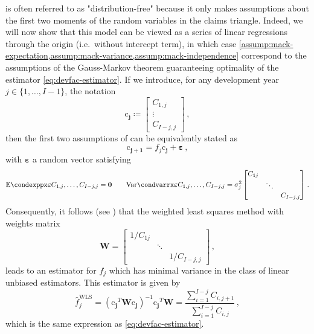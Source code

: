 \documentclass[a4paper]{book}
\begin{document}
 is often referred to as "distribution-free" because it only makes assumptions about the first two moments of the random variables in the claims triangle. Indeed, we will now show that this model can be viewed as a series of linear regressions through the origin (i.e.\ without intercept term), in which case \cref{assump:mack-expectation,assump:mack-variance,assump:mack-independence} correspond to the assumptions of the Gauss-Markov theorem guaranteeing optimality of the estimator \cref{eq:devfac-estimator}. If we introduce, for any development year $j \in \{ 1, \dots, {I - 1} \}$, the notation
\begin{equation}
  \bm{\mathrm{c}_j} \coloneqq
  \begin{bmatrix}
    C_{1, j} \\
    \vdots   \\
    C_{I - j, j}
  \end{bmatrix} \,,
\end{equation}
then the first two assumptions of  can be equivalently stated as
\begin{equation}
  \bm{\mathrm{c}_{j + 1}} = f_j \bm{\mathrm{c}_j} + \bm{\varepsilon} \,,
\end{equation}
with $\bm{\varepsilon}$ a random vector satisfying
\begin{equation}
  \condexpp{\bm{\varepsilon}}{C_{1, j}, \dots, C_{I - j, j}} = \bm{0}
  \qquad%
  \condvarr{\bm{\varepsilon}}{C_{1, j}, \dots, C_{I - j, j}} = \sigma^2_j
  \begin{bmatrix}
    C_{1j} &        &              \\
           & \ddots &              \\
           &        & C_{I - j, j}
  \end{bmatrix} \,.
\end{equation}
Consequently, it follows (see \cite[Proposition 1.7]{hayashi}) that the weighted least squares method with weights matrix
\begin{equation}
  \mathbf{W} =
  \begin{bmatrix}
    1 / C_{1j} &        &                  \\
               & \ddots &                  \\
               &        & 1 / C_{I - j, j}
  \end{bmatrix} \,,
\end{equation}
leads to an estimator for $f_j$ which has minimal variance in the class of linear unbiased estimators. This estimator is given by
\begin{equation}
  \widehat{f}^{\mathrm{WLS}}_j = (\bm{\mathrm{c}_j}^T \mathbf{W} \bm{\mathrm{c}_j})^{-1} \bm{\mathrm{c}_j}^T \mathbf{W} = \frac{\sum_{i = 1}^{I - j} C_{i, j + 1}}{\sum_{i = 1}^{I - j} C_{i, j}} \,,
\end{equation}
which is the same expression as \cref{eq:devfac-estimator}.
\end{document}
